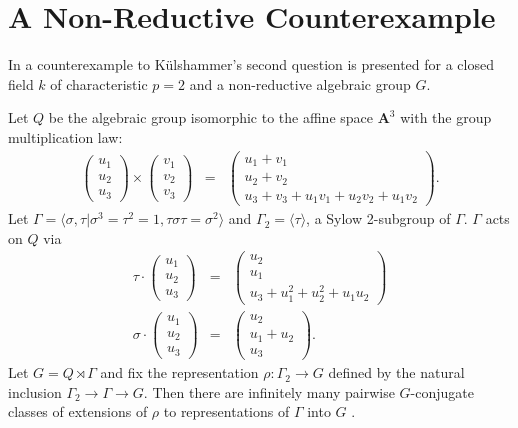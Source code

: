 \section{A Non-Reductive Counterexample}
In \cite{slodowy1997two} a counterexample to K\"ulshammer's second question is presented for a closed field $k$ of characteristic $p = 2$ and a non-reductive algebraic group $G$.
\begin{example} Let $Q$ be the algebraic group isomorphic to the affine space $\mathbf{A}^3$ with the group multiplication law:
\begin{eqnarray*}
	\left(\begin{matrix} u_1 \\ u_2 \\ u_3 \end{matrix}\right) \times
	\left(\begin{matrix} v_1 \\ v_2 \\ v_3 \end{matrix}\right) &=&
	\left(\begin{matrix} u_1 + v_1 \\ u_2 + v_2 \\ u_3 + v_3 + u_1v_1 + u_2v_2 + u_1v_2 \end{matrix}\right).
\end{eqnarray*}
Let $\Gamma = \langle \sigma, \tau | \sigma^3 = \tau^2 = 1, \tau\sigma\tau = \sigma^2 \rangle$ and $\Gamma_2 = \langle \tau \rangle$, a Sylow 2-subgroup of $\Gamma$. $\Gamma$ acts on $Q$ via
\begin{eqnarray*}
	\tau \cdot \left(\begin{matrix} u_1 \\ u_2 \\ u_3 \end{matrix} \right) &=&
	\left(\begin{matrix} u_2 \\ u_1 \\ u_3 + u_1^2 + u_2^2 + u_1u_2 \end{matrix} \right) \\
	\sigma \cdot \left(\begin{matrix} u_1 \\ u_2 \\ u_3 \end{matrix} \right) &=&
	\left(\begin{matrix} u_2 \\ u_1 + u_2 \\ u_3 \end{matrix} \right).
\end{eqnarray*}
Let $G = Q \rtimes \Gamma$ and fix the representation $\rho:\Gamma_2 \rightarrow G$ defined by the natural inclusion $\Gamma_2 \rightarrow \Gamma \rightarrow G$. Then there are infinitely many pairwise $G$-conjugate classes of extensions of $\rho$ to representations of $\Gamma$ into $G$ \cite[Appendix]{slodowy1997two}.
\label{eg:non_red}
\end{example}
